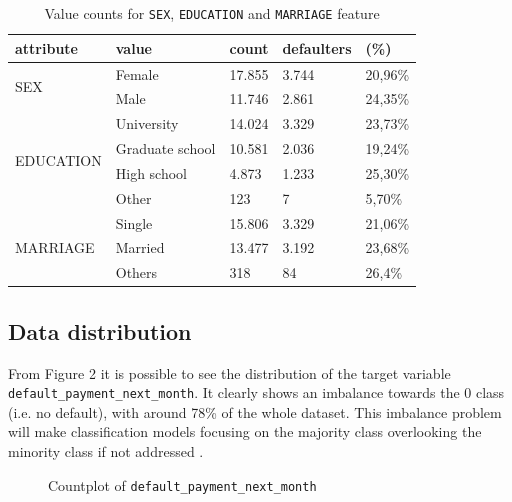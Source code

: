 \documentclass{article}
\begin{document}
\begin{table}[h]
\centering
\begin{tabular}{lllll}
\textbf{attribute}         & \textbf{value}  & \textbf{count} & \textbf{defaulters} & \textbf{(\%)} \\ \hline 
\multirow{2}{*}{SEX}       & Female          & 17.855         & 3.744               & 20,96\%       \\
                           & Male            & 11.746         & 2.861               & 24,35\%       \\ \hline 
\multirow{4}{*}{EDUCATION} & University      & 14.024         & 3.329               & 23,73\%       \\
                           & Graduate school & 10.581         & 2.036               & 19,24\%       \\
                           & High school     & 4.873          & 1.233               & 25,30\%       \\
                           & Other           & 123            & 7                   & 5,70\%        \\ \hline 
\multirow{3}{*}{MARRIAGE}  & Single          & 15.806         & 3.329               & 21,06\%       \\
                           & Married         & 13.477         & 3.192               & 23,68\%       \\
                           & Others          & 318            & 84                  & 26,4\%       
\end{tabular}
\caption{Value counts for \texttt{SEX}, \texttt{EDUCATION} and \texttt{MARRIAGE} feature}
\end{table}

\subsection{Data distribution}

From Figure 2 it is possible to see the distribution of the target variable \texttt{default\_payment\_next\_month}. It clearly shows an imbalance towards the 0 class (i.e. no default), with around 78\% of the whole dataset. This imbalance problem will make classification models focusing on the majority class overlooking the minority class if not addressed \cite{tre}.

\begin{figure}[H]
\centering

\caption{Countplot of \texttt{default\_payment\_next\_month}}
\end{figure}
\end{document}
